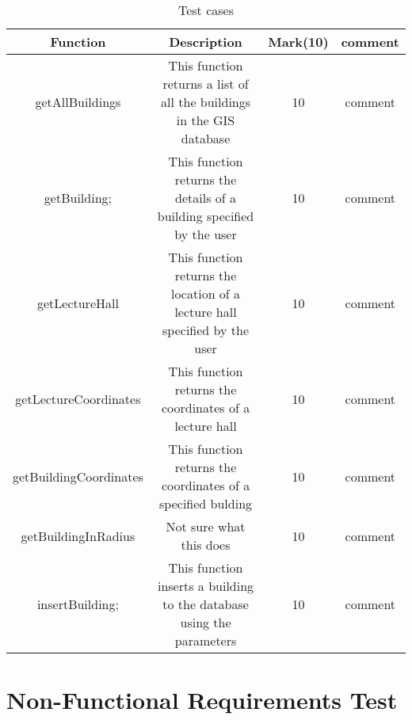 \documentclass[12pt]{article}
\begin{document}
		
		\begin{table}[h!]	
			\newlength{\longline}
			\settowidth{\longline}{This function returns a}
			\centering
			\caption{Test cases }
			\label{tab:table1}
			\begin{tabular}{|c|c|c|c|}
				
				\hline
				\hline
				Function  & Description & Mark(10)  & comment\\
				\hline
				\hline
				
				getAllBuildings  & \parbox[t]{\longline}{This function returns a list of all the buildings in the GIS database} & 10 & \parbox[t]{\longline}{comment}\\
				
				\hline
				getBuilding; & \parbox[t]{\longline}{This function returns the details of a building specified by the user} &  10 & \parbox[t]{\longline}{comment}\\
				\hline
				getLectureHall & \parbox[t]{\longline}{This function returns the location of a lecture hall specified by the user} & 10 & \parbox[t]{\longline}{comment}\\
				\hline
				getLectureCoordinates & \parbox[t]{\longline}{This function returns the coordinates of a lecture hall} & 10 & \parbox[t]{\longline}{comment}\\
				\hline
				getBuildingCoordinates & \parbox[t]{\longline}{This function returns the coordinates of a specified bulding} &  10 & \parbox[t]{\longline}{comment}\\
				\hline
				getBuildingInRadius & \parbox[t]{\longline}{Not sure what this does} & 10 & \parbox[t]{\longline}{comment}\\
				\hline
				insertBuilding; & \parbox[t]{\longline}{This function inserts a building to the database using the parameters} &  10 & \parbox[t]{\longline}{comment}\\
				\hline
			\end{tabular}
	
		\end{table}
	
		



\section{Non-Functional Requirements Test}
\end{document}
